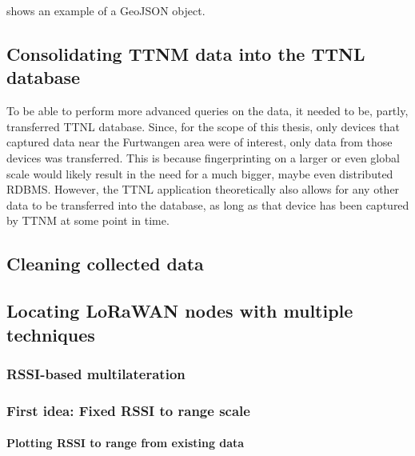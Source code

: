 shows an example of a GeoJSON object.

\subsection{Consolidating \acl{TTNM} data into the \acl{TTNL} database}

To be able to perform more advanced queries on the data, it needed to be, partly, transferred \ac{TTNL} database.
Since, for the scope of this thesis, only devices that captured data near the Furtwangen area were of interest, only data from those devices was transferred.
This is because fingerprinting on a larger or even global scale would likely result in the need for a much bigger, maybe even distributed \ac{RDBMS}.
However, the \ac{TTNL} application theoretically also allows for any other data to be transferred into the database, as long as that device has been captured by \ac{TTNM} at some point in time.


\subsection{Cleaning collected data}


\subsection{Locating \acs{LoRaWAN} nodes with multiple techniques}

\subsubsection{\ac{RSSI}-based multilateration}

\subsubsection{First idea: Fixed \ac{RSSI} to range scale}


\paragraph{Plotting \ac{RSSI} to range from existing data}

